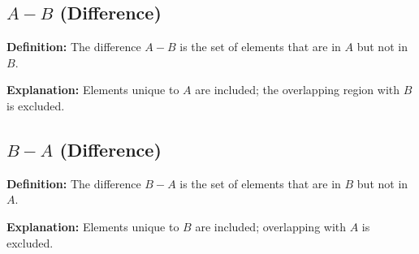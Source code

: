 \begin{tcolorbox}[sectionbox]

\subsection*{$A - B$ (Difference)}
\textbf{Definition:} The difference $A - B$ is the set of elements that are in $A$ but not in $B$.  

\begin{center}
\end{center}

\textbf{Explanation:} Elements unique to $A$ are included; the overlapping region with $B$ is excluded.

\subsection*{$B - A$ (Difference)}
\textbf{Definition:} The difference $B - A$ is the set of elements that are in $B$ but not in $A$.  

\begin{center}
\end{center}

\textbf{Explanation:} Elements unique to $B$ are included; overlapping with $A$ is excluded.


\end{tcolorbox}
